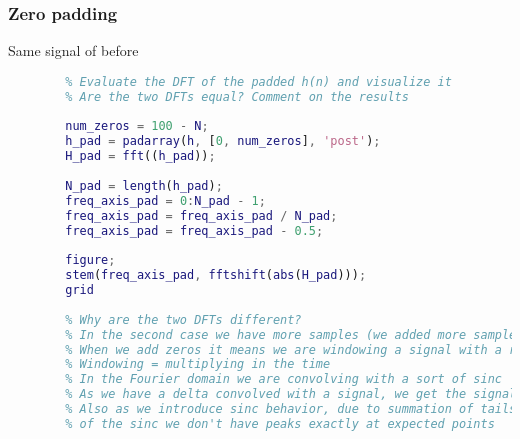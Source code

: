     \subsubsection{Zero padding}
    Same signal of before
    \begin{lstlisting}[language=Matlab, escapeinside=`']
        % Pad the array h(n) with zeros until reaching 100 samples
        % Evaluate the DFT of the padded h(n) and visualize it
        % Are the two DFTs equal? Comment on the results
        
        num_zeros = 100 - N;
        h_pad = padarray(h, [0, num_zeros], 'post');
        H_pad = fft((h_pad));
        
        N_pad = length(h_pad);
        freq_axis_pad = 0:N_pad - 1;
        freq_axis_pad = freq_axis_pad / N_pad;
        freq_axis_pad = freq_axis_pad - 0.5;
        
        figure;
        stem(freq_axis_pad, fftshift(abs(H_pad)));
        grid
        
        % Why are the two DFTs different?
        % In the second case we have more samples (we added more samples)
        % When we add zeros it means we are windowing a signal with a rectangle
        % Windowing = multiplying in the time
        % In the Fourier domain we are convolving with a sort of sinc
        % As we have a delta convolved with a signal, we get the signal
        % Also as we introduce sinc behavior, due to summation of tails
        % of the sinc we don't have peaks exactly at expected points
    \end{lstlisting}

